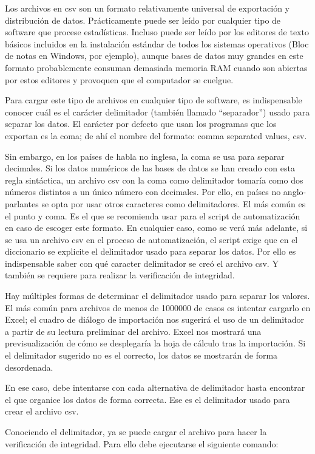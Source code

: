 \documentclass[
  spanish,
]{book}
\begin{document}
Los archivos en csv son un formato relativamente universal de exportación y distribución de datos. Prácticamente puede ser leído por cualquier tipo de software que procese estadísticas. Incluso puede ser leído por los editores de texto básicos incluidos en la instalación estándar de todos los sistemas operativos (Bloc de notas en Windows, por ejemplo), aunque bases de datos muy grandes en este formato probablemente consuman demasiada memoria RAM cuando son abiertas por estos editores y provoquen que el computador se cuelgue.

Para cargar este tipo de archivos en cualquier tipo de software, es indispensable conocer cuál es el carácter delimitador (también llamado ``separador'') usado para separar los datos. El carácter por defecto que usan los programas que los exportan es la coma; de ahí el nombre del formato: comma separated values, csv.

Sin embargo, en los países de habla no inglesa, la coma se usa para separar decimales. Si los datos numéricos de las bases de datos se han creado con esta regla sintáctica, un archivo csv con la coma como delimitador tomaría como dos números distintos a un único número con decimales. Por ello, en países no anglo-parlantes se opta por usar otros caracteres como delimitadores. El más común es el punto y coma. Es el que se recomienda usar para el script de automatización en caso de escoger este formato. En cualquier caso, como se verá más adelante, si se usa un archivo csv en el proceso de automatización, el script exige que en el diccionario se explicite el delimitador usado para separar los datos. Por ello es indispensable saber con qué caracter delimitador se creó el archivo csv. Y también se requiere para realizar la verificación de integridad.

Hay múltiples formas de determinar el delimitador usado para separar los valores. El más común para archivos de menos de 1000000 de casos es intentar cargarlo en Excel; el cuadro de diálogo de importación nos sugerirá el uso de un delimitador a partir de su lectura preliminar del archivo. Excel nos mostrará una previsualización de cómo se desplegaría la hoja de cálculo tras la importación. Si el delimitador sugerido no es el correcto, los datos se mostrarán de forma desordenada.

En ese caso, debe intentarse con cada alternativa de delimitador hasta encontrar el que organice los datos de forma correcta. Ese es el delimitador usado para crear el archivo csv.

Conociendo el delimitador, ya se puede cargar el archivo para hacer la verificación de integridad. Para ello debe ejecutarse el siguiente comando:
\end{document}

